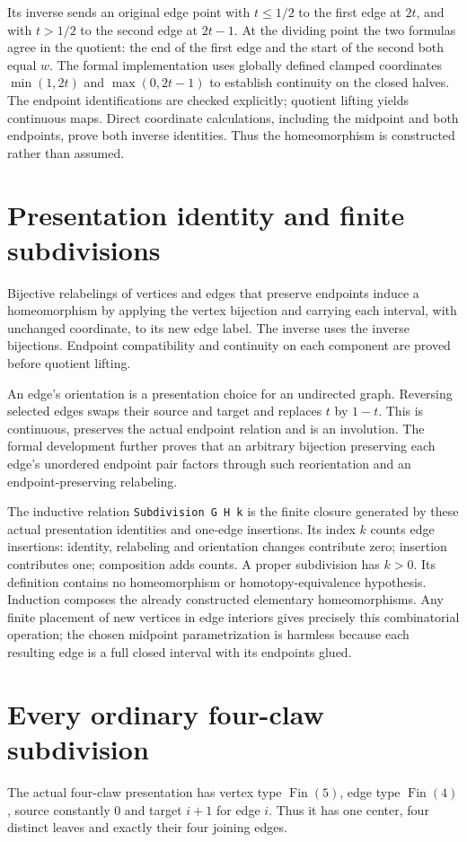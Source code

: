 \documentclass[11pt]{article}
\begin{document}
Its inverse sends an original edge point with $t\leq 1/2$ to the first edge at
$2t$, and with $t>1/2$ to the second edge at $2t-1$. At the dividing point the
two formulas agree in the quotient: the end of the first edge and the start
of the second both equal $w$. The formal implementation uses globally defined
clamped coordinates $\min(1,2t)$ and $\max(0,2t-1)$ to establish continuity
on the closed halves. The endpoint identifications are checked explicitly;
quotient lifting yields continuous maps. Direct coordinate calculations, including
the midpoint and both endpoints, prove both inverse identities. Thus the
homeomorphism is constructed rather than assumed.

\section*{Presentation identity and finite subdivisions}
Bijective relabelings of vertices and edges that preserve endpoints induce a
homeomorphism by applying the vertex bijection and carrying each interval, with
unchanged coordinate, to its new edge label. The inverse uses the inverse
bijections. Endpoint compatibility and continuity on each component are proved
before quotient lifting.

An edge's orientation is a presentation choice for an undirected graph. Reversing
selected edges swaps their source and target and replaces $t$ by $1-t$. This is
continuous, preserves the actual endpoint relation and is an involution. The
formal development further proves that an arbitrary bijection preserving each
edge's unordered endpoint pair factors through such reorientation and an
endpoint-preserving relabeling.

The inductive relation \texttt{Subdivision G H k} is the finite closure generated
by these actual presentation identities and one-edge insertions. Its index $k$
counts edge insertions: identity, relabeling and orientation changes contribute
zero; insertion contributes one; composition adds counts. A proper subdivision
has $k>0$. Its definition contains no homeomorphism or homotopy-equivalence
hypothesis. Induction composes the already constructed elementary homeomorphisms.
Any finite placement of new vertices in edge interiors gives precisely this
combinatorial operation; the chosen midpoint parametrization is harmless because
each resulting edge is a full closed interval with its endpoints glued.

\section*{Every ordinary four-claw subdivision}
The actual four-claw presentation has vertex type $\operatorname{Fin}(5)$,
edge type $\operatorname{Fin}(4)$, source constantly $0$ and target $i+1$ for
edge $i$. Thus it has one center, four distinct leaves and exactly their four
joining edges.
\end{document}
